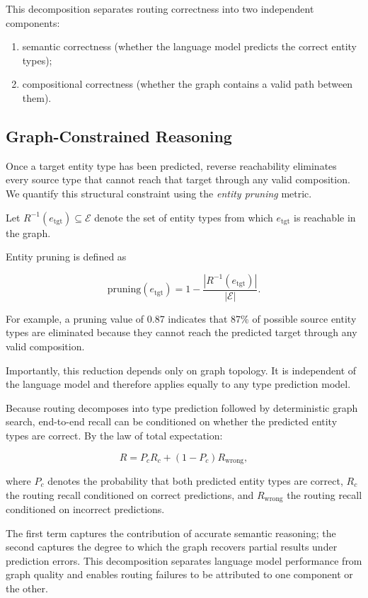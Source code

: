 This decomposition separates routing correctness into two independent components:

\begin{enumerate}
\item semantic correctness (whether the language model predicts the correct entity types);
\item compositional correctness (whether the graph contains a valid path between them).
\end{enumerate}

\subsection{Graph-Constrained Reasoning}
\label{sec:graph-constraint}

Once a target entity type has been predicted, reverse reachability eliminates every source type that cannot reach that target through any valid composition.
We quantify this structural constraint using the \emph{entity pruning} metric.

Let
$R^{-1}(e_{\mathrm{tgt}})\subseteq\mathcal{E}$
denote the set of entity types from which
$e_{\mathrm{tgt}}$
is reachable in the graph.

Entity pruning is defined as

\begin{equation}
    \mathrm{pruning}(e_{\mathrm{tgt}})
    =
    1-
    \frac{
        |R^{-1}(e_{\mathrm{tgt}})|
    }{
        |\mathcal{E}|
    }.
    \label{eq:entity-pruning}
\end{equation}

For example, a pruning value of 0.87 indicates that 87\% of possible source entity types are eliminated because they cannot reach the predicted target through any valid composition.

Importantly, this reduction depends only on graph topology.
It is independent of the language model and therefore applies equally to any type prediction model.

Because routing decomposes into type prediction followed by deterministic graph search, end-to-end recall can be conditioned on whether the predicted entity types are correct.
By the law of total expectation:

\begin{equation}
    R
    =
    P_cR_c
    +
    (1-P_c)R_{\text{wrong}},
    \label{eq:recall-decomposition}
\end{equation}

where $P_c$ denotes the probability that both predicted entity types are correct,
$R_c$ the routing recall conditioned on correct predictions,
and $R_{\text{wrong}}$ the routing recall conditioned on incorrect predictions.

The first term captures the contribution of accurate semantic reasoning; the second captures the degree to which the graph recovers partial results under prediction errors.
This decomposition separates language model performance from graph quality and enables routing failures to be attributed to one component or the other.